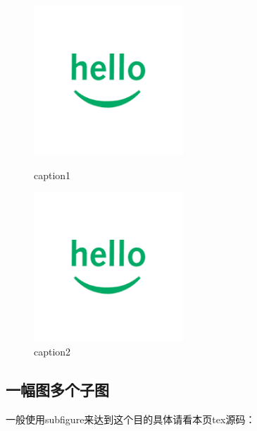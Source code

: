 \begin{figure}[htbp]
\begin{minipage}{0.5\linewidth}
\centering
\includegraphics[width=0.5\textwidth]{hello.png}
\caption{caption1}
\label{hello1}
\end{minipage}%
\begin{minipage}{0.5\linewidth}
\centering
\includegraphics[width=0.5\textwidth]{hello.png}
\caption{caption2}
\label{hello2}
\end{minipage}
\end{figure}

\subsection{一幅图多个子图}

一般使用subfigure来达到这个目的具体请看本页tex源码：

